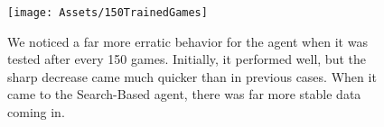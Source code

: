 \begin{figure}[b]
	\centering
	\texttt{[image: Assets/150TrainedGames]}
	\caption{We noticed a far more erratic behavior for the agent when it was tested after every 150 games. Initially, it performed well, but the sharp decrease came much quicker than in previous cases. When it came to the Search-Based agent, there was far more stable data coming in.}
	\label{fig:150TrainedResults}
\end{figure}